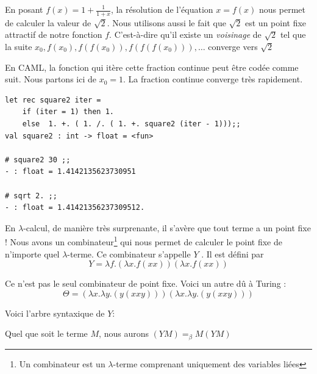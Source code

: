 \documentclass[11pt]{book}
\begin{document}
En posant $ f(x) = 1 + \frac{1}{1+x} $, la résolution de l'équation $x=f(x)$ nous permet
de calculer la valeur de $\sqrt{2}$. Nous utilisons aussi le fait que $\sqrt{2}$ est 
un point fixe attractif de notre fonction $f$. C'est-à-dire qu'il existe un \textit{voisinage} de 
$\sqrt{2}$ tel que la suite $ x_0,f(x_0),f(f(x_0)),f(f(f(x_0))),\dots $ converge vers $\sqrt{2}$


En CAML, la fonction qui it\`{e}re cette fraction continue peut être codée comme suit. 
Nous partons ici de $x_0 =1$. La fraction continue converge très rapidement.
\begin{Verbatim}
let rec square2 iter =
	if (iter = 1) then 1.
	else  1. +. ( 1. /. ( 1. +. square2 (iter - 1)));;
val square2 : int -> float = <fun>

# square2 30 ;;
- : float = 1.4142135623730951

# sqrt 2. ;;
- : float = 1.41421356237309512.

\end{Verbatim}


En $\lambda $-calcul, de manière très surprenante, il s'avère que tout terme a un point fixe !
Nous avons un combinateur\footnote{Un combinateur est un $\lambda$-terme comprenant uniquement 
des variables li\'{e}es} qui nous permet de calculer le point fixe de n'importe quel $\lambda $-terme.
Ce combinateur s'appelle $Y$ . Il est défini par $$ Y=  \lambda f.(\lambda x.f(x x))(\lambda x.f(x x)) $$

Ce n'est pas le seul combinateur de point fixe. Voici un autre d\^{u} \`{a} Turing :
 $$\Theta = (\lambda x. \lambda y. (y (x x y))) (\lambda x. \lambda y. (y (x x y)))$$

Voici l'arbre syntaxique de $Y$:
\begin{center}
\end{center}
Quel que soit le terme $M$, nous aurons  $(YM) = _\beta M(YM)$
\end{document}
